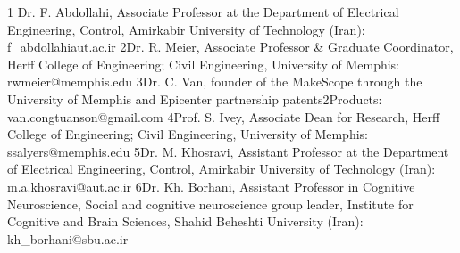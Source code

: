 


\begin{cvskills}
  \cvskill
  {1} %
  {Dr. F. Abdollahi, Associate Professor at the Department of Electrical Engineering, Control, Amirkabir University of Technology (Iran): f\_abdollahiaut.ac.ir} %
  \cvskill
    {2}{Dr. R. Meier, Associate Professor \& Graduate Coordinator, Herff College of Engineering; Civil Engineering, University of Memphis: rwmeier@memphis.edu}
  \cvskill
    {3}{Dr. C. Van, founder of the MakeScope through the University of Memphis and Epicenter partnership patents2Products: van.congtuanson@gmail.com}
  \cvskill
  {4}{Prof. S. Ivey, Associate Dean for Research, Herff College of Engineering; Civil Engineering, University of Memphis: ssalyers@memphis.edu}
    \cvskill
	{5}{Dr. M. Khosravi, Assistant Professor at the Department of Electrical Engineering, Control, Amirkabir University of Technology (Iran): m.a.khosravi@aut.ac.ir}
    \cvskill
	{6}{Dr. Kh. Borhani, Assistant Professor in Cognitive Neuroscience, Social and cognitive neuroscience group leader, Institute for Cognitive and Brain Sciences, Shahid Beheshti University (Iran): kh\_borhani@sbu.ac.ir}
\end{cvskills}